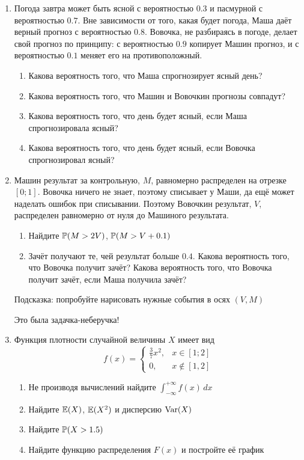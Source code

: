 \begin{enumerate}

\item Погода завтра может быть ясной с вероятностью $0.3$ и пасмурной с вероятностью $0.7$.
Вне зависимости от того, какая будет погода, Маша даёт верный прогноз с вероятностью $0.8$.
Вовочка, не разбираясь в погоде, делает свой прогноз по принципу: с вероятностью $0.9$
копирует Машин прогноз, и с вероятностью $0.1$ меняет его на противоположный.
\begin{enumerate}
\item Какова вероятность того, что Маша спрогнозирует ясный день?
\item Какова вероятность того, что Машин и Вовочкин прогнозы совпадут?
\item Какова вероятность того, что день будет ясный, если Маша спрогнозировала ясный?
\item Какова вероятность того, что день будет ясный, если Вовочка спрогнозировал ясный?
\end{enumerate}

\item Машин результат за контрольную, $M$, равномерно распределен на отрезке $[0;1]$.
Вовочка ничего не знает, поэтому списывает у Маши, да ещё может наделать ошибок при
списывании. Поэтому Вовочкин результат, $V$, распределен равномерно от нуля до Машиного
результата.
\begin{enumerate}
\item Найдите $\P(M>2V)$, $\P(M>V+0.1)$
\item Зачёт получают те, чей результат больше $0.4$. Какова вероятность того, что Вовочка получит зачёт? Какова вероятность того, что Вовочка получит зачёт, если Маша получила зачёт?
\end{enumerate}
Подсказка: попробуйте нарисовать нужные события в осях $(V,M)$

Это была задачка-неберучка!

\item Функция плотности случайной величины $X$ имеет вид
\[
f(x)=
\begin{cases}
\frac{3}{7}x^2, & x\in[1;2] \\
0,& x \notin [1,2]
\end{cases}
\]
\begin{enumerate}
\item Не производя вычислений найдите $\int_{-\infty}^{+\infty}f(x)\,dx$
\item Найдите $\E(X)$, $\E(X^2)$ и дисперсию $\Var(X)$
\item Найдите $\P(X>1.5)$
\item Найдите функцию распределения $F(x)$ и постройте её график
\end{enumerate}


\end{enumerate}
